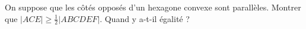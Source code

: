 On suppose que les côtés opposés d'un hexagone convexe sont parallèles. Montrer que $|ACE| \geq \frac{1}{2}|ABCDEF|$. Quand y a-t-il égalité ?
